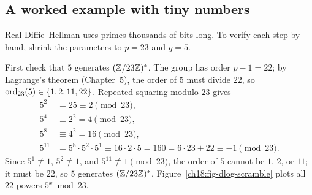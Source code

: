 \subsection{A worked example with tiny numbers}
\label{ch18:tiny}

Real Diffie--Hellman uses primes thousands of bits long. To verify each step by hand, shrink the parameters to $p = 23$ and $g = 5$.

First check that $5$ generates $(\mathbb{Z}/23\mathbb{Z})^{*}$. The group has order $p - 1 = 22$; by Lagrange's theorem (Chapter~5), the order of $5$ must divide $22$, so $\operatorname{ord}_{23}(5) \in \{1, 2, 11, 22\}$. Repeated squaring modulo $23$ gives
\begin{align*}
  5^2 &= 25 \equiv 2 \pmod{23}, \\
  5^4 &\equiv 2^2 = 4 \pmod{23}, \\
  5^8 &\equiv 4^2 = 16 \pmod{23}, \\
  5^{11} &= 5^8 \cdot 5^2 \cdot 5^1 \equiv 16 \cdot 2 \cdot 5 = 160 = 6 \cdot 23 + 22 \equiv -1 \pmod{23}.
\end{align*}
Since $5^1 \not\equiv 1$, $5^2 \not\equiv 1$, and $5^{11} \not\equiv 1 \pmod{23}$, the order of $5$ cannot be $1$, $2$, or $11$; it must be $22$, so $5$ generates $(\mathbb{Z}/23\mathbb{Z})^{*}$. Figure~\ref{ch18:fig-dlog-scramble} plots all $22$ powers $5^x \bmod 23$.

